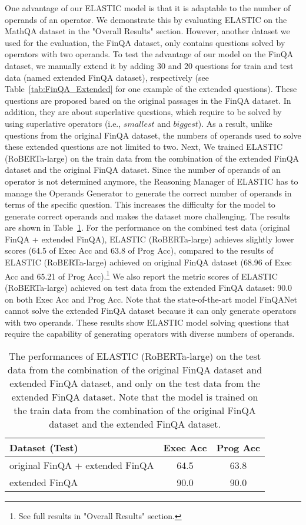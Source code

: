 \documentclass{article}
\begin{document}
One advantage of our ELASTIC model is that it is adaptable to the number of operands of an operator. We demonstrate this by evaluating ELASTIC on the MathQA dataset in the "Overall Results" section. However, another dataset we used for the evaluation, the FinQA dataset, only contains questions solved by operators with two operands. To test the advantage of our model on the FinQA dataset, we manually extend it by adding 30 and 20 questions for train and test data (named extended FinQA dataset), respectively (see Table~\ref{tab:FinQA_Extended} for one example of the extended questions). These questions are proposed based on the original passages in the FinQA dataset. In addition, they are about superlative questions, which require to be solved by using superlative operators (i.e., \(\textit{smallest}\) and \(\textit{biggest}\)). As a result, unlike questions from the original FinQA dataset, the numbers of operands used to solve these extended questions are not limited to two. Next, We trained ELASTIC (RoBERTa-large) on the train data from the combination of the extended FinQA dataset and the original FinQA dataset. Since the number of operands of an operator is not determined anymore, the Reasoning Manager of ELASTIC has to manage the Operands Generator to generate the correct number of operands in terms of the specific question. This increases the difficulty for the model to generate correct operands and makes the dataset more challenging. The results are shown in Table~\ref{tab:FinQA-Most}. For the performance on the combined test data (original FinQA + extended FinQA), ELASTIC (RoBERTa-large) achieves slightly lower scores (64.5 of Exec Acc and 63.8 of Prog Acc), compared to the results of ELASTIC (RoBERTa-large) achieved on original FinQA dataset (68.96 of Exec Acc and 65.21 of Prog Acc).\footnote{See full results in "Overall Results" section.} We also report the metric scores of ELASTIC (RoBERTa-large) achieved on test data from the extended FinQA dataset: 90.0 on both Exec Acc and Prog Acc. Note that the state-of-the-art model FinQANet cannot solve the extended FinQA dataset because it can only generate operators with two operands. These results show ELASTIC model solving questions that require the capability of generating operators with diverse numbers of operands. 

\begin{table}[tbhp!]
\centering
\caption{The performances of ELASTIC (RoBERTa-large) on the test data from the combination of the original FinQA dataset and extended FinQA dataset, and only on the test data from the extended FinQA dataset. Note that the model is trained on the train data from the combination of the original FinQA dataset and the extended FinQA dataset.}
\label{tab:FinQA-Most}
\begin{tabular}{@{}lcc@{}}
\toprule
Dataset (Test)             & Exec Acc & Prog Acc \\ \midrule
original FinQA + extended FinQA  & 64.5     & 63.8     \\ 
extended FinQA  & 90.0    & 90.0     \\ \bottomrule
\end{tabular}
\end{table}
\end{document}

